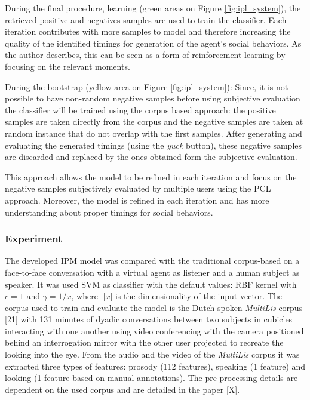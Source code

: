 During the final procedure, learning (green areas on Figure \ref{fig:ipl_system}), the retrieved positive and negatives samples are used to train the classifier. Each iteration contributes with more samples to model and therefore increasing the quality of the identified timings for generation of the agent's social behaviors. As the author describes, this can be seen as a form of reinforcement learning by focusing on the relevant moments.

During the bootstrap (yellow area on Figure \ref{fig:ipl_system}): Since, it is not possible to have non-random negative samples before using subjective evaluation the classifier will be trained using the corpus based approach: the positive samples are taken directly from the corpus and the negative samples are taken at random instance that do not overlap with the first samples. After generating and evaluating the generated timings (using the \textit{yuck} button), these negative samples are discarded and replaced by the ones obtained form the subjective evaluation.

This approach allows the model to be refined in each iteration and focus on the negative samples subjectively evaluated by multiple users using the \ac{PCL} approach. Moreover, the model is refined in each iteration and has more understanding about proper timings for social behaviors.

\subsubsection*{Experiment}
The developed \ac{IPM} model was compared with the traditional corpus-based on a face-to-face conversation with a virtual agent as listener and a human subject as speaker. It was used \ac{SVM} as classifier with the default values: RBF kernel with $c = 1$ and $\gamma = 1/x$, where $[|x|$ is the dimensionality of the input vector. The corpus used to train and evaluate the model is the Dutch-spoken \textit{MultiLis} corpus [21] with 131 minutes of dyadic conversations between two subjects in cubicles interacting with one another using video conferencing with the camera positioned behind an interrogation mirror with the other user projected to recreate the looking into the eye. From the audio and the video of the \textit{MultiLis} corpus it was extracted three types of features: prosody (112 features), speaking (1 feature) and looking (1 feature based on manual annotations). The pre-processing details are dependent on the used corpus and are detailed in the paper [X].


